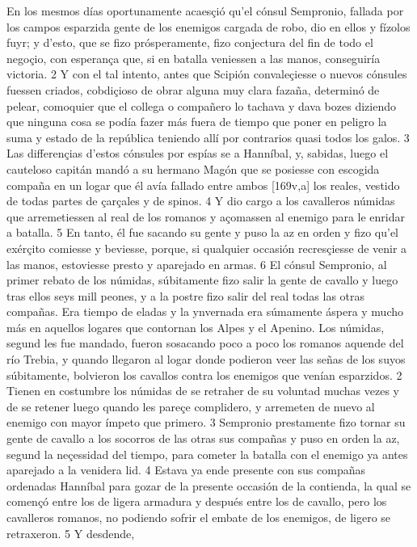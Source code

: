 \documentclass[11pt,twoside]{article}\makeatletter
\def\persName{}\def\name{}
\begin{document}
\pend
{} En los mesmos días oportunamente acaesçió qu’el cónsul Sempronio, fallada por los campos esparzida gente de los enemigos cargada de robo, dio en ellos y fízolos fuyr; y d’esto, que se fizo prósperamente, fizo conjectura del fin de todo el negoçio, con esperança que, si en batalla veniessen a las manos, conseguiría victoria. 2 Y con el tal intento, antes que Scipión convaleçiesse o nuevos cónsules fuessen criados, cobdiçioso de obrar alguna muy clara fazaña, determinó de pelear, comoquier que el collega o compañero lo tachava y dava bozes diziendo que ninguna cosa se podía fazer más fuera de tiempo que poner en peligro la suma y estado de la república teniendo allí por contrarios quasi todos los galos. 3 Las differençias d’estos cónsules por espías se  a  {\persName Hanníbal}, y, sabidas, luego el cauteloso capitán mandó a su hermano Magón que se posiesse con escogida compaña en un logar que él avía fallado entre ambos %
[169v,a] los reales, vestido de todas partes de çarçales y de spinos. 4 Y dio cargo a los cavalleros númidas que arremetiessen al real de los romanos y açomassen al enemigo para le enridar a batalla. 5 En tanto, él fue sacando su gente y puso la az en orden y fizo qu’el exérçito comiesse y beviesse, porque, si qualquier occasión recresçiesse de venir a las manos, estoviesse presto y aparejado en armas. 6 El cónsul Sempronio, al primer rebato de los númidas, súbitamente fizo salir la gente de cavallo y luego tras ellos seys mill peones, y a la postre fizo salir del real todas las otras compañas.
\pend
{} Era tiempo de eladas y la ynvernada era súmamente áspera y mucho más en aquellos logares que contornan los Alpes y el Apenino. Los númidas, segund les fue mandado, fueron sosacando poco a poco los romanos aquende del río Trebia, y quando llegaron al logar donde podieron veer las señas de los suyos súbitamente, bolvieron los cavallos contra los enemigos que venían esparzidos. 2 Tienen en costumbre los númidas de se retraher de su voluntad muchas vezes y de se retener luego quando les pareçe complidero, y arremeten de nuevo al enemigo con mayor ímpeto que primero. 3 Sempronio prestamente fizo tornar su gente de cavallo a los socorros de las otras sus compañas y puso en orden la az, segund la neçessidad del tiempo, para cometer la batalla con el enemigo ya antes aparejado a la venidera lid. 4 Estava ya ende presente con sus compañas ordenadas  {\persName Hanníbal} para gozar de la presente occasión de la contienda, la qual se començó  entre los de ligera armadura y después entre los de cavallo, pero los cavalleros romanos, no podiendo sofrir el embate de los enemigos, de ligero se retraxeron. 5 Y desdende, %
\end{document}
